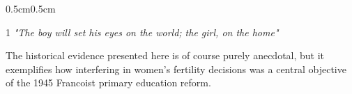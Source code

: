 \documentclass[a4paper,oneside,final,onecolumn,12pt,english]{article}
\begin{document}
\begin{adjustwidth}{0.5cm}{0.5cm} 
\begin{spacing}{1}
 \textit{"The boy will set his eyes on the world; the girl, on the home"  \citep[][p. 215]{perez_canto}} %
\end{spacing}
\end{adjustwidth}

The historical evidence presented here is of course purely anecdotal, but it exemplifies how interfering in women's fertility decisions was a central objective of the 1945 Francoist primary education reform.


\end{document}
